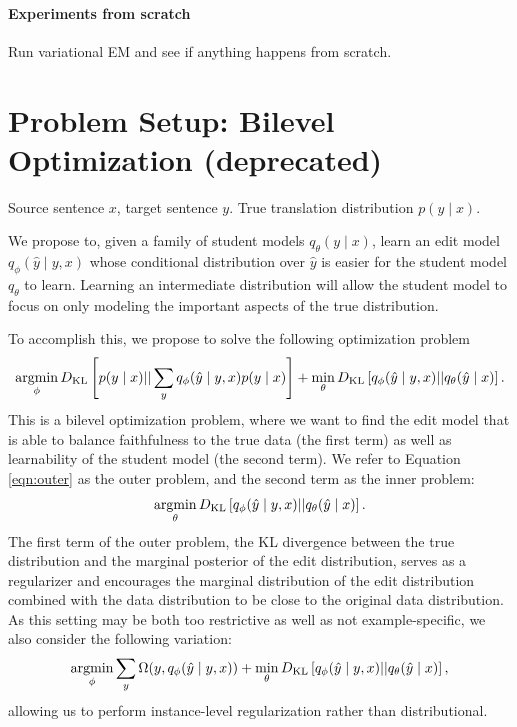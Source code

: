 \documentclass[11pt]{article}
\begin{document}
\paragraph{Experiments from scratch}
Run variational EM and see if anything happens from scratch.

\section{Problem Setup: Bilevel Optimization (deprecated)}
Source sentence $x$, target sentence $y$.
True translation distribution $p(y \mid x)$.

We propose to, given a family of student models $q_\theta(y \mid x)$,
learn an edit model $q_\phi(\hat{y} \mid y, x)$ whose conditional distribution over $\hat{y}$
is easier for the student model $q_\theta$ to learn.
Learning an intermediate distribution will allow the student model to focus on only modeling
the important aspects of the true distribution.

To accomplish this, we propose to solve the following optimization problem
\begin{equation}
    \label{eqn:outer}
    \operatorname*{argmin}_\phi D_\mathrm{KL}\left[p(y \mid x) || \sum_y q_\phi(\hat{y} \mid y, x)p(y \mid x)\right]
    + \min_\theta D_\mathrm{KL}\left[q_\phi(\hat{y} \mid y, x) || q_\theta(\hat{y} \mid x)\right].
\end{equation}
This is a bilevel optimization problem, where we want to find the edit model
that is able to balance faithfulness to the true data (the first term)
as well as learnability of the student model (the second term).
We refer to Equation \ref{eqn:outer} as the outer problem,
and the second term as the inner problem:
\begin{equation}
    \label{eqn:inner}
    \operatorname*{argmin}_\theta D_\mathrm{KL}\left[q_\phi(\hat{y} \mid y, x) || q_\theta(\hat{y} \mid x)\right].
\end{equation}
The first term of the outer problem, the KL divergence between the true distribution
and the marginal posterior of the edit distribution,
serves as a regularizer and encourages the marginal distribution of
the edit distribution combined with the data distribution to be close to the
original data distribution.
As this setting may be both too restrictive as well as not example-specific,
we also consider the following variation:
\begin{equation}
    \label{eqn:regularized-bilevel}
    \operatorname*{argmin}_\phi \sum_y \Omega(y, q_\phi(\hat{y} \mid y, x))
    + \min_\theta D_\mathrm{KL}\left[q_\phi(\hat{y} \mid y, x) || q_\theta(\hat{y} \mid x)\right],
\end{equation}
allowing us to perform instance-level regularization rather than distributional.
\end{document}

